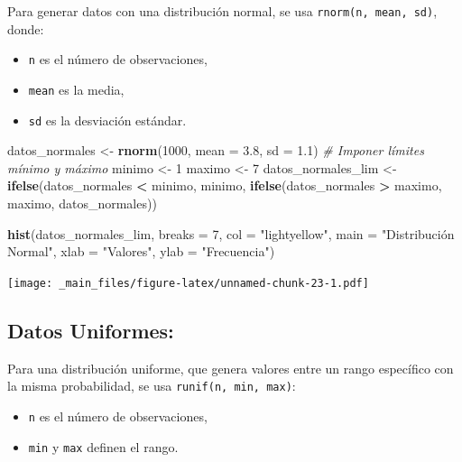 \documentclass[
]{book}
\newenvironment{Shaded}{\begin{snugshade}}{\end{snugshade}}
\newcommand{\AttributeTok}[1]{\textcolor[rgb]{0.13,0.29,0.53}{#1}}
\newcommand{\CommentTok}[1]{\textcolor[rgb]{0.56,0.35,0.01}{\textit{#1}}}
\newcommand{\DecValTok}[1]{\textcolor[rgb]{0.00,0.00,0.81}{#1}}
\newcommand{\FloatTok}[1]{\textcolor[rgb]{0.00,0.00,0.81}{#1}}
\newcommand{\FunctionTok}[1]{\textcolor[rgb]{0.13,0.29,0.53}{\textbf{#1}}}
\newcommand{\NormalTok}[1]{#1}
\newcommand{\OtherTok}[1]{\textcolor[rgb]{0.56,0.35,0.01}{#1}}
\newcommand{\SpecialCharTok}[1]{\textcolor[rgb]{0.81,0.36,0.00}{\textbf{#1}}}
\newcommand{\StringTok}[1]{\textcolor[rgb]{0.31,0.60,0.02}{#1}}
\providecommand{\tightlist}{%
  \setlength{\itemsep}{0pt}\setlength{\parskip}{0pt}}
\begin{document}
Para generar datos con una distribución normal, se usa \texttt{rnorm(n,\ mean,\ sd)}, donde:

\begin{itemize}
\tightlist
\item
  \texttt{n} es el número de observaciones,\\
\item
  \texttt{mean} es la media,\\
\item
  \texttt{sd} es la desviación estándar.
\end{itemize}

\begin{Shaded}
\begin{Highlighting}[]
\NormalTok{datos\_normales }\OtherTok{\textless{}{-}} \FunctionTok{rnorm}\NormalTok{(}\DecValTok{1000}\NormalTok{, }\AttributeTok{mean =} \FloatTok{3.8}\NormalTok{, }\AttributeTok{sd =} \FloatTok{1.1}\NormalTok{)}
\CommentTok{\# Imponer límites mínimo y máximo}
\NormalTok{minimo }\OtherTok{\textless{}{-}} \DecValTok{1}
\NormalTok{maximo }\OtherTok{\textless{}{-}} \DecValTok{7}
\NormalTok{datos\_normales\_lim }\OtherTok{\textless{}{-}} \FunctionTok{ifelse}\NormalTok{(datos\_normales }\SpecialCharTok{\textless{}}\NormalTok{ minimo, minimo, }
                         \FunctionTok{ifelse}\NormalTok{(datos\_normales }\SpecialCharTok{\textgreater{}}\NormalTok{ maximo, maximo, datos\_normales))}

\FunctionTok{hist}\NormalTok{(datos\_normales\_lim, }
     \AttributeTok{breaks =} \DecValTok{7}\NormalTok{, }
     \AttributeTok{col =} \StringTok{"lightyellow"}\NormalTok{, }
     \AttributeTok{main =} \StringTok{"Distribución Normal"}\NormalTok{, }
     \AttributeTok{xlab =} \StringTok{"Valores"}\NormalTok{,}
     \AttributeTok{ylab =} \StringTok{"Frecuencia"}\NormalTok{)}
\end{Highlighting}
\end{Shaded}

\texttt{[image: \_main\_files/figure-latex/unnamed-chunk-23-1.pdf]}

\subsection{Datos Uniformes:}\label{datos-uniformes}

Para una distribución uniforme, que genera valores entre un rango específico con la misma probabilidad, se usa \texttt{runif(n,\ min,\ max)}:

\begin{itemize}
\tightlist
\item
  \texttt{n} es el número de observaciones,\\
\item
  \texttt{min} y \texttt{max} definen el rango.
\end{itemize}
\end{document}
